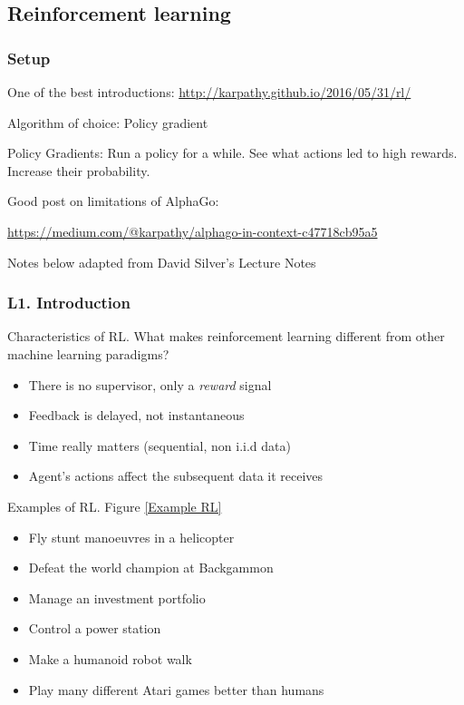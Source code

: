 \documentclass[english]{article}
\begin{document}
\eenum


\subsection{Reinforcement learning}
\subsubsection{Setup}
\benum
\item One of the best introductions: 
\url{http://karpathy.github.io/2016/05/31/rl/}
\item Algorithm of choice: Policy gradient

Policy Gradients: Run a policy for a while. See what actions led to high rewards. Increase their probability.


\item Good post on limitations of AlphaGo: 

\url{https://medium.com/@karpathy/alphago-in-context-c47718cb95a5}


\item Notes below adapted from David Silver's Lecture Notes
\eenum 



\subsubsection{L1. Introduction}
\benum 

\item {Characteristics of RL}.
What makes reinforcement learning different from other machine
learning paradigms?
\begin{itemize}
    \item There is no supervisor, only a \textit{reward} signal
    \item Feedback is delayed, not instantaneous
    \item Time really matters (sequential, non i.i.d data)
    \item Agent's actions affect the subsequent data it receives
\end{itemize}



\item {Examples of RL}. Figure \ref{Example RL}
\begin{itemize}
    \item Fly stunt manoeuvres in a helicopter
    \item Defeat the world champion at Backgammon
    \item Manage an investment portfolio
    \item Control a power station
    \item Make a humanoid robot walk
    \item Play many different Atari games better than humans
\end{itemize}
\end{document}
